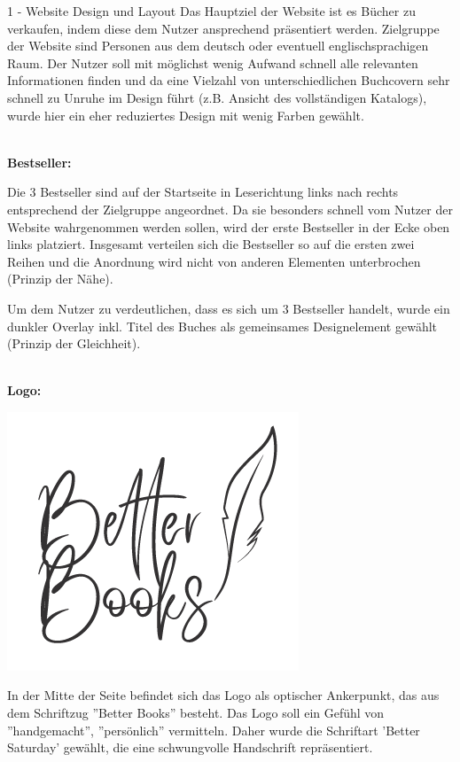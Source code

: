 \documentclass[a4paper]{article}
\begin{document}
\begin{exercise}{1 - Website Design und Layout} 
Das Hauptziel der Website ist es Bücher zu verkaufen, indem diese dem Nutzer ansprechend präsentiert werden. Zielgruppe der Website sind Personen aus dem deutsch oder eventuell englischsprachigen Raum.
Der Nutzer soll mit möglichst wenig Aufwand schnell alle relevanten Informationen finden und da eine Vielzahl von unterschiedlichen Buchcovern sehr schnell zu Unruhe im Design führt (z.B. Ansicht des vollständigen Katalogs), wurde hier ein eher reduziertes Design mit wenig Farben gewählt.\\\\

\begin{Large}
\textbf{Bestseller:}
\end{Large}
Die 3 Bestseller sind auf der Startseite in Leserichtung links nach rechts entsprechend der Zielgruppe angeordnet. Da sie besonders schnell vom Nutzer der Website wahrgenommen werden sollen, wird der erste Bestseller in der Ecke oben links platziert. Insgesamt verteilen sich die Bestseller so auf die ersten zwei Reihen und die Anordnung wird nicht von anderen Elementen unterbrochen (Prinzip der Nähe).

Um dem Nutzer zu verdeutlichen, dass es sich um 3 Bestseller handelt, wurde ein dunkler Overlay inkl. Titel des Buches als gemeinsames Designelement gewählt (Prinzip der Gleichheit).\\\\

\begin{Large}
\textbf{Logo:}
\end{Large}
\begin{center}
\includegraphics[scale=0.5]{../logo.png}
\end{center}
In der Mitte der Seite befindet sich das Logo als optischer Ankerpunkt, das aus dem Schriftzug ''Better Books'' besteht. Das Logo soll ein Gefühl von ''handgemacht'', ''persönlich'' vermitteln. Daher wurde die Schriftart 'Better Saturday' gewählt, die eine schwungvolle Handschrift repräsentiert. 


\end{exercise}
\end{document}
